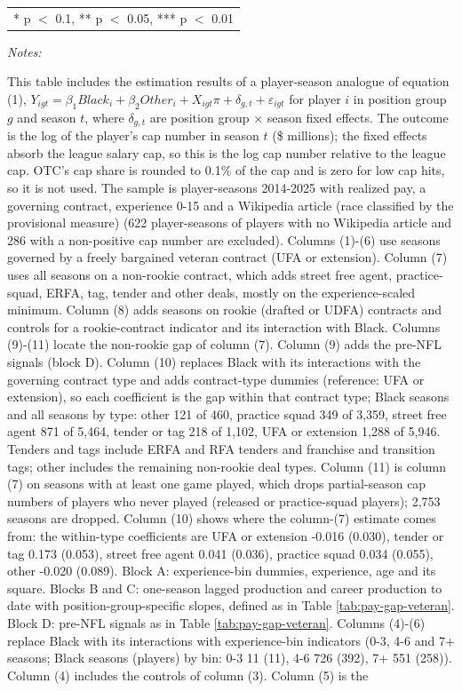 \begin{table}[!h]
{\begin{threeparttable}
\begin{tabular}[t]{lccccccccccc}
\bottomrule
\multicolumn{12}{l}{\rule{0pt}{1em}* p $<$ 0.1, ** p $<$ 0.05, *** p $<$ 0.01}\\
\end{tabular}
\begin{tablenotes}[para]
\item \textit{Notes:} 
\item This table includes the estimation results of a player-season analogue of equation (1), $Y_{igt} = \beta_1 Black_i + \beta_2 Other_i + X_{igt}\pi + \delta_{g,t} + \varepsilon_{igt}$ for player $i$ in position group $g$ and season $t$, where $\delta_{g,t}$ are position group $\times$ season fixed effects. The outcome is the log of the player's cap number in season $t$ (\$ millions); the fixed effects absorb the league salary cap, so this is the log cap number relative to the league cap. OTC's cap share is rounded to 0.1\% of the cap and is zero for low cap hits, so it is not used. The sample is player-seasons 2014-2025 with realized pay, a governing contract, experience 0-15 and a Wikipedia article (race classified by the provisional measure) (622 player-seasons of players with no Wikipedia article and 286 with a non-positive cap number are excluded). Columns (1)-(6) use seasons governed by a freely bargained veteran contract (UFA or extension). Column (7) uses all seasons on a non-rookie contract, which adds street free agent, practice-squad, ERFA, tag, tender and other deals, mostly on the experience-scaled minimum. Column (8) adds seasons on rookie (drafted or UDFA) contracts and controls for a rookie-contract indicator and its interaction with Black. Columns (9)-(11) locate the non-rookie gap of column (7). Column (9) adds the pre-NFL signals (block D). Column (10) replaces Black with its interactions with the governing contract type and adds contract-type dummies (reference: UFA or extension), so each coefficient is the gap within that contract type; Black seasons and all seasons by type: other 121 of 460, practice squad 349 of 3,359, street free agent 871 of 5,464, tender or tag 218 of 1,102, UFA or extension 1,288 of 5,946. Tenders and tags include ERFA and RFA tenders and franchise and transition tags; other includes the remaining non-rookie deal types. Column (11) is column (7) on seasons with at least one game played, which drops partial-season cap numbers of players who never played (released or practice-squad players); 2,753 seasons are dropped. Column (10) shows where the column-(7) estimate comes from: the within-type coefficients are UFA or extension -0.016 (0.030), tender or tag 0.173 (0.053), street free agent 0.041 (0.036), practice squad 0.034 (0.055), other -0.020 (0.089). Block A: experience-bin dummies, experience, age and its square. Blocks B and C: one-season lagged production and career production to date with position-group-specific slopes, defined as in Table \ref{tab:pay-gap-veteran}. Block D: pre-NFL signals as in Table \ref{tab:pay-gap-veteran}. Columns (4)-(6) replace Black with its interactions with experience-bin indicators (0-3, 4-6 and 7+ seasons; Black seasons (players) by bin: 0-3 11 (11), 4-6 726 (392), 7+ 551 (258)). Column (4) includes the controls of column (3). Column (5) is the 
\end{tablenotes}
\end{threeparttable}}
\end{table}
